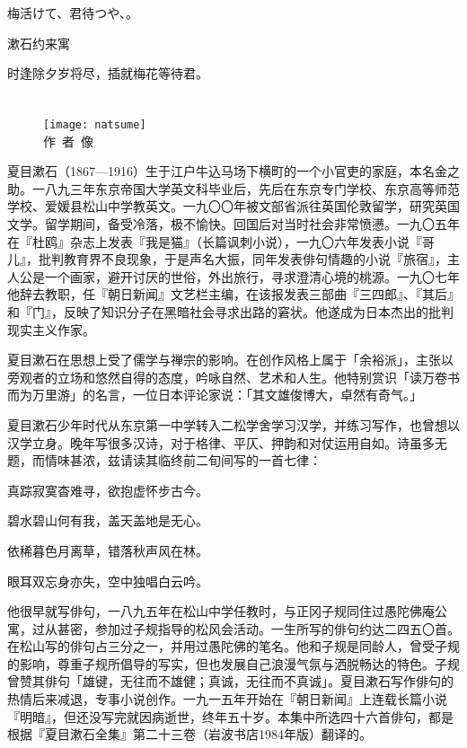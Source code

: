 \begin{haiku}
    {\FH 梅活けて、君待つや、。}

    {\FK 漱石约来寓}

    {\FK 时逢除夕岁将尽，插就梅花等待君。}
\end{haiku}

\chapter[{\FM 夏目漱石}]{\FM {}}

\begin{center}
    \begin{figure}
        \centering
        \texttt{[image: natsume]}\\[1em]
        \large{\FS 作~者~像}
    \end{figure}
\end{center}

\newpage

{\FS
    夏目漱石（1867—1916）生于江户牛込马场下横町的一个小官吏的家庭，本名金之助。一八九三年东京帝国大学英文科毕业后，先后在东京专门学校、东京高等师范学校、爱媛县松山中学教英文。一九〇〇年被文部省派往英国伦敦留学，研究英国文学。留学期间，备受冷落，极不愉快。回国后对当时社会非常愤懑。一九〇五年在『杜鸥』杂志上发表『我是猫』（长篇讽刺小说），一九〇六年发表小说『哥儿』，批判教育界不良现象，于是声名大振，同年发表俳句情趣的小说『旅宿』，主人公是一个画家，避开讨厌的世俗，外出旅行，寻求澄清心境的桃源。一九〇七年他辞去教职，任『朝日新闻』文艺栏主编，在该报发表三部曲『三四郎』、『其后』和『门』，反映了知识分子在黑暗社会寻求出路的窘状。他遂成为日本杰出的批判现实主义作家。

    夏目漱石在思想上受了儒学与禅宗的影响。在创作风格上属于「余裕派」，主张以旁观者的立场和悠然自得的态度，吟咏自然、艺术和人生。他特别赏识「读万卷书而为万里游」的名言，一位日本评论家说：「其文雄俊博大，卓然有奇气。」

    夏目漱石少年时代从东京第一中学转入二松学舍学习汉学，并练习写作，也曾想以汉学立身。晚年写很多汉诗，对于格律、平仄、押韵和对仗运用自如。诗虽多无题，而情味甚浓，兹请读其临终前二旬间写的一首七律：
    \begin{center}
        真踪寂寞杳难寻，欲抱虚怀步古今。

        碧水碧山何有我，盖天盖地是无心。

        依稀暮色月离草，错落秋声风在林。

        眼耳双忘身亦失，空中独唱白云吟。
    \end{center}

    他很早就写俳句，一八九五年在松山中学任教时，与正冈子规同住过愚陀佛庵公寓，过从甚密，参加过子规指导的松风会活动。一生所写的俳句约达二四五〇首。在松山写的俳句占三分之一，并用过愚陀佛的笔名。他和子规是同龄人，曾受子规的影响，尊重子规所倡导的写实，但也发展自己浪漫气氛与洒脱畅达的特色。子规曾赞其俳句「雄键，无往而不雄健；真诚，无往而不真诚」。夏目漱石写作俳句的热情后来减退，专事小说创作。一九一五年开始在『朝日新闻』上连载长篇小说『明暗』，但还没写完就因病逝世，终年五十岁。本集中所选四十六首俳句，都是根据『夏目漱石全集』第二十三卷（岩波书店1984年版）翻译的。
}

